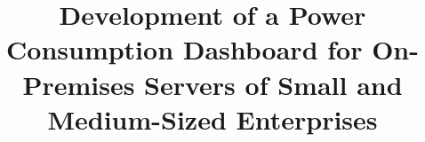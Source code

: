 \title{Development of a Power Consumption Dashboard for On-Premises Servers of Small and Medium-Sized Enterprises}